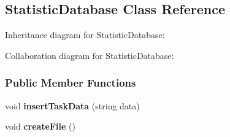 \hypertarget{a00085}{}\subsection{Statistic\+Database Class Reference}
\label{a00085}


Inheritance diagram for Statistic\+Database\+:


Collaboration diagram for Statistic\+Database\+:
\subsubsection*{Public Member Functions}
\begin{DoxyCompactItemize}
\item 
\hypertarget{a00085_ab900a61b8b7bb8831310595ec218d9a7}{}void {\bfseries insert\+Task\+Data} (string data)\label{a00085_ab900a61b8b7bb8831310595ec218d9a7}

\item 
\hypertarget{a00085_a61738008aaa921c5e25248944e003763}{}void {\bfseries create\+File} ()\label{a00085_a61738008aaa921c5e25248944e003763}

\end{DoxyCompactItemize}
